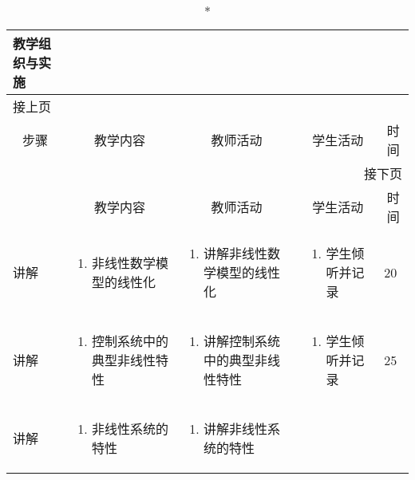 {%
\begin{landscape}

\begin{longtable}{|m{10mm}|m{50mm}|m{50mm}|m{50mm}|m{15mm}|}
\caption*{\huge 教学组织与实施}\\
\hline
\endfirsthead
\multicolumn{5}{l}{\small 接上页}\\
\hline
\multicolumn{1}{|c|}{步骤}&\multicolumn{1}{c|}{教学内容}&\multicolumn{1}{c|}{教师活动}&\multicolumn{1}{c|}{学生活动}&\multicolumn{1}{c|}{时间}\\
\hline
\endhead

\multicolumn{5}{r}{\small 接下页}\\
\endfoot
\hline
\endlastfoot
\multicolumn{1}{|c|}{步骤}&\multicolumn{1}{c|}{教学内容}&\multicolumn{1}{c|}{教师活动}&\multicolumn{1}{c|}{学生活动}&\multicolumn{1}{c|}{时间}\\\hline
讲解&\begin{enumerate}
\item 非线性数学模型的线性化
\end{enumerate} &\begin{enumerate}
\item 讲解非线性数学模型的线性化
\end{enumerate} &\begin{enumerate}
\item 学生倾听并记录
\end{enumerate} &20\\\hline
讲解&\begin{enumerate}
\item 控制系统中的典型非线性特性
\end{enumerate}
 &\begin{enumerate}
\item 讲解控制系统中的典型非线性特性
\end{enumerate} &\begin{enumerate}
\item 学生倾听并记录
\end{enumerate} &25 \\\hline
讲解&\begin{enumerate}
\item 非线性系统的特性
\end{enumerate}
&\begin{enumerate}
\item 讲解非线性系统的特性
\end{enumerate} &\begin{enumerate}

\end{enumerate}
\end{longtable}
\end{landscape}}
